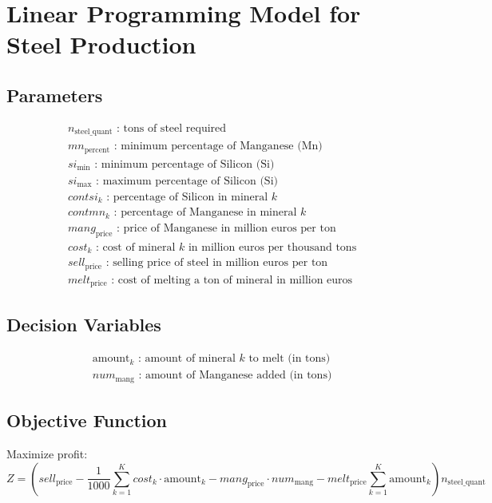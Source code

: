 \documentclass{article}
\begin{document}
\section*{Linear Programming Model for Steel Production}

\subsection*{Parameters}
\begin{align*}
& n_{\text{steel\_quant}} \text{ : tons of steel required} \\
& mn_{\text{percent}} \text{ : minimum percentage of Manganese (Mn)} \\
& si_{\text{min}} \text{ : minimum percentage of Silicon (Si)} \\
& si_{\text{max}} \text{ : maximum percentage of Silicon (Si)} \\
& contsi_k \text{ : percentage of Silicon in mineral } k \\
& contmn_k \text{ : percentage of Manganese in mineral } k \\
& mang_{\text{price}} \text{ : price of Manganese in million euros per ton} \\
& cost_k \text{ : cost of mineral } k \text{ in million euros per thousand tons} \\
& sell_{\text{price}} \text{ : selling price of steel in million euros per ton} \\
& melt_{\text{price}} \text{ : cost of melting a ton of mineral in million euros}
\end{align*}

\subsection*{Decision Variables}
\begin{align*}
& \text{amount}_k \text{ : amount of mineral } k \text{ to melt (in tons)} \\
& num_{\text{mang}} \text{ : amount of Manganese added (in tons)}
\end{align*}

\subsection*{Objective Function}
Maximize profit:
\[
Z = \left( sell_{\text{price}} - \frac{1}{1000} \sum_{k=1}^{K} cost_k \cdot \text{amount}_k - mang_{\text{price}} \cdot num_{\text{mang}} - melt_{\text{price}} \sum_{k=1}^{K} \text{amount}_k \right) n_{\text{steel\_quant}}
\]
\end{document}

